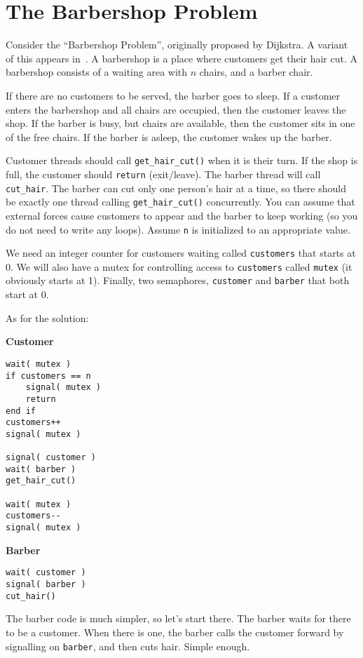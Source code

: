 \section*{The Barbershop Problem}
Consider the ``Barbershop Problem'', originally proposed by Dijkstra. A variant of this appears in~\cite{osc}. A barbershop is a place where customers get their hair cut. A barbershop consists of a waiting area with $n$ chairs, and a barber chair.

If there are no customers to be served, the barber goes to sleep. If a customer enters the barbershop and all chairs are occupied, then the customer leaves the shop. If the barber is busy, but chairs are available, then the customer sits in one of the free chairs. If the barber is asleep, the customer wakes up the barber.

Customer threads should call \texttt{get\_hair\_cut()} when it is their turn. If the shop is full, the customer should \texttt{return} (exit/leave). The barber thread will call \texttt{cut\_hair}. The barber can cut only one person's hair at a time, so there should be exactly one thread calling \texttt{get\_hair\_cut()} concurrently. You can assume that external forces cause customers to appear and the barber to keep working (so you do not need to write any loops). Assume \texttt{n} is initialized to an appropriate value.

We need an integer counter for customers waiting called \texttt{customers} that starts at 0. We will also have a mutex for controlling access to \texttt{customers} called \texttt{mutex} (it obviously starts at 1). Finally, two semaphores, \texttt{customer} and \texttt{barber} that both start at 0.

As for the solution:
\begin{multicols}{2}
	\textbf{Customer}
	\begin{lstlisting}
wait( mutex )
if customers == n
    signal( mutex )
    return
end if
customers++
signal( mutex )

signal( customer )
wait( barber )
get_hair_cut()

wait( mutex )
customers--
signal( mutex )
\end{lstlisting}
	\columnbreak
	\textbf{Barber}
	\begin{lstlisting}
wait( customer )
signal( barber )
cut_hair()
  \end{lstlisting}
\end{multicols}


The barber code is much simpler, so let's start there. The barber waits for there to be a customer. When there is one, the barber calls the customer forward by signalling on \texttt{barber}, and then cuts hair. Simple enough.

